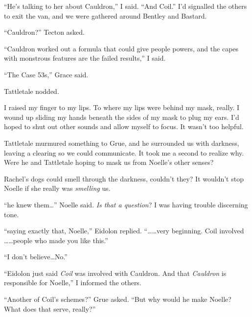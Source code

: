 





``He's talking to her about Cauldron,'' I said.  ``And Coil.''  I'd signalled the others to exit the van, and we were gathered around Bentley and Bastard.



``Cauldron?''  Tecton asked.



``Cauldron worked out a formula that could give people powers, and the capes with monstrous features are the failed results,'' I said.



``The Case 53s,'' Grace said.



Tattletale nodded.



I raised my finger to my lips.  To where my lips were behind my mask, really.  I wound up sliding my hands beneath the sides of my mask to plug my ears.  I'd hoped to shut out other sounds and allow myself to focus.  It wasn't too helpful.



Tattletale murmured something to Grue, and he surrounded us with darkness, leaving a clearing so we could communicate.  It took me a second to realize why.  Were he and Tattletale hoping to mask us from Noelle's other senses?



Rachel's dogs could smell through the darkness, couldn't they?  It wouldn't stop Noelle if she really was \emph{smelling} us.



``\ldotssaying he knew them\ldots'' Noelle said.  \emph{Is that a question}?  I was having trouble discerning tone.



``\ldotsm saying exactly that, Noelle,'' Eidolon replied.  ``\ldots \ldots very beginning.  Coil involved \ldots \ldots people who made you like this.''



``I don't believe\ldots No.''



``Eidolon just said \emph{Coil} was involved with Cauldron.  And that \emph{Cauldron} is responsible for Noelle,'' I informed the others.



``Another of Coil's schemes?'' Grue asked.  ``But why would he make Noelle?  What does that serve, really?''



